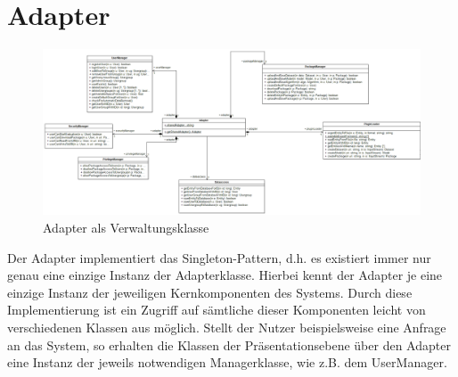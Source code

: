 \section{Adapter}

\begin{figure}[h]
\centering
\includegraphics[width=1.0\linewidth]{Grafik/Klassendiagramme/adapter.png}
\caption{Adapter als Verwaltungsklasse}
\end{figure}

Der Adapter implementiert das Singleton-Pattern, d.h. es existiert immer nur genau eine einzige Instanz der Adapterklasse. Hierbei kennt der Adapter je eine einzige Instanz der jeweiligen Kernkomponenten des Systems. Durch diese Implementierung ist ein Zugriff auf sämtliche dieser Komponenten leicht von verschiedenen Klassen aus möglich. Stellt der Nutzer beispielsweise eine Anfrage an das System, so erhalten die Klassen der Präsentationsebene über den Adapter eine Instanz der jeweils notwendigen Managerklasse, wie z.B. dem UserManager.